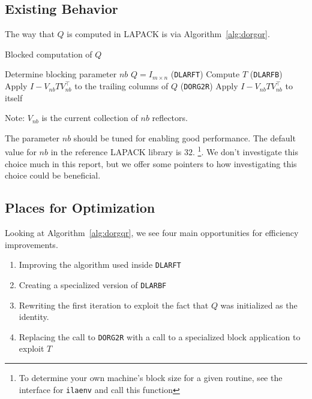 \documentclass[12pt]{article}
\begin{document}
    \subsection{Existing Behavior}

    The way that $Q$ is computed in LAPACK is via Algorithm~\ref{alg:dorgqr}.

    \begin{algorithm}
        \caption{Blocked computation of $Q$}\label{alg:dorgqr}
        \begin{algorithmic}[1]
            \STATE Determine blocking parameter $nb$
            \STATE $Q = I_{m\times n}$
                \STATE (\verb|DLARFT|) Compute $T$
                \STATE (\verb|DLARFB|) Apply $I-V_{nb}TV_{nb}^\top$ to the trailing columns of $Q$
                \STATE (\verb|DORG2R|) Apply $I-V_{nb}TV_{nb}^\top$ to itself
            \ENDFOR
        \end{algorithmic}
    \end{algorithm}

    Note: $V_{nb}$ is the current collection of $nb$ reflectors.

    The parameter $nb$ should be tuned for enabling good performance. The default value for $nb$ in the reference LAPACK library is $32$.
\footnote{To determine your own machine's block size for a given routine, see the interface for 
    \verb+ilaenv+ and call this function}. We don't investigate this choice much in this report, but we offer 
    some pointers to how investigating this choice could be beneficial.

    \subsection{Places for Optimization}
    Looking at Algorithm~\ref{alg:dorgqr}, we see four main opportunities for efficiency improvements. 
    \begin{enumerate}
        \item Improving the algorithm used inside \verb|DLARFT|
        \item Creating a specialized version of \verb|DLARBF|
        \item Rewriting the first iteration to exploit the fact that $Q$ was initialized as the identity.
        \item Replacing the call to \verb|DORG2R| with a call to a specialized block application to exploit $T$
    \end{enumerate}
\end{document}
